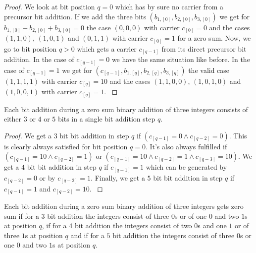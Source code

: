 \begin{proof}
    We look at bit position $q = 0$ which has by sure no carrier from a precursor bit addition. If we add the three bits $\left(b_{1,[0]}, b_{2,[0]}, b_{3,[0]}\right)$ we get for $b_{1,[0]} + b_{2,[0]} + b_{3,[0]} = 0$ the case $\left(0,0,0\right)$ with carrier $c_{[0]} = 0$ and the cases $\left(1,1,0\right)$, $\left(1,0,1\right)$ and $\left(0,1,1\right)$ with carrier $c_{[0]} = 1$ for a zero sum. Now, we go to bit position $q > 0$ which gets a carrier $c_{[q - 1]}$ from its direct precursor bit addition. In the case of $c_{[q-1]} = 0$ we have the same situation like before. In the case of $c_{[q-1]} = 1$ we get for $\left(c_{[q-1]}, b_{1,[q]}, b_{2,[q]}, b_{3,[q]}\right)$ the valid case $\left(1,1,1,1\right)$ with carrier $c_{[q]} = 10$ and the cases $\left(1,1,0,0\right)$, $\left(1,0,1,0\right)$ and $\left(1,0,0,1\right)$ with carrier $c_{[q]} = 1$.
\label{proof:carriers}
\end{proof}

\begin{theorem}
    Each bit addition during a zero sum binary addition of three integers consists of either $3$ or $4$ or $5$ bits in a single bit addition step $q$. 
\label{theorem:numberofsinglebitadditionbits}
\end{theorem}

\begin{proof}
    We get a $3$ bit bit addition in step $q$ if $\left(c_{[q-1]} = 0 \wedge c_{[q-2]} = 0\right)$. This is clearly always satisfied for bit position $q = 0$. It's also always fulfilled if $\left(c_{[q-1]} = 10 \wedge c_{[q-2]} = 1\right)$ or $\left(c_{[q-1]} = 10 \wedge c_{[q-2]} = 1 \wedge c_{[q-3]} = 10\right)$. We get a $4$ bit bit addition in step $q$ if $c_{[q-1]} = 1$ which can be generated by $c_{[q-2]} = 0$ or by $c_{[q-2]} = 1$. Finally, we get a $5$ bit bit addition in step $q$ if $c_{[q-1]} = 1$ and $c_{[q-2]} = 10$.
\label{proof:numberofsinglebitadditionbits}
\end{proof}


\begin{theorem}
    Each bit addition during a zero sum binary addition of three integers gets zero sum if for a $3$ bit addition the integers consist of three $0$s or of one $0$ and two $1$s at position $q$, if for a $4$ bit addition the integers consist of two $0$s and one $1$ or of three $1$s at position $q$ and if for a $5$ bit addition the integers consist of three $0$s or one $0$ and two $1$s at position $q$.
\label{theorem:numberof0sand1sinintegersforzerosum}
\end{theorem}


